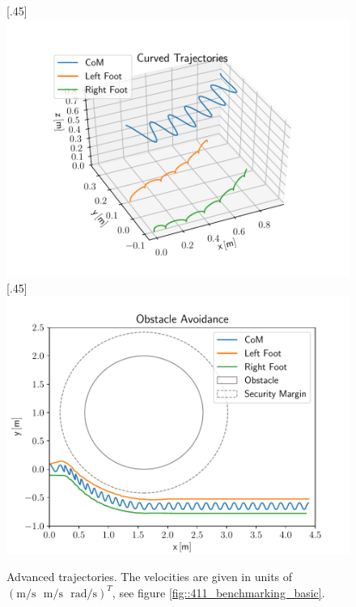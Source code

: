 \begin{figure}[h!]
	\centering
	[.45\linewidth]{\includegraphics[scale=.45]{chapters/06_walking_experiments/01_user_controlled_walking/01_benchmarking/nmpc_turn.pdf}}
	[.45\linewidth]{\includegraphics[scale=.45]{chapters/06_walking_experiments/01_user_controlled_walking/01_benchmarking/nmpc_obstacle.pdf}}
	\caption{Advanced trajectories. The velocities are given in units of\\$(\text{m}/\text{s}\,\,\,\,\text{m}/\text{s}\,\,\,\,\text{rad}/\text{s})^T$, see figure \ref{fig::411_benchmarking_basic}.}
	\label{fig::411_benchmarking_advanced}
\end{figure} 
